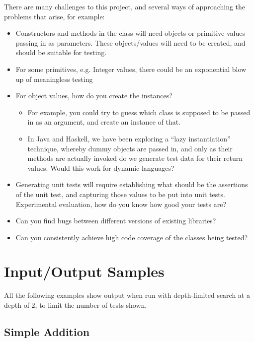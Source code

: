 There are many challenges to this project, and several ways of
approaching the problems that arise, for example:

\begin{itemize}
\item Constructors and methods in the class will need objects or primitive
  values passing in as parameters. These objects/values will need
  to be created, and should be suitable for testing.

\item For some primitives, e.g. Integer values, there could be an exponential
  blow up of meaningless testing

\item For object values, how do you create the instances?
\begin{itemize}
\item For example, you could try to guess which class is supposed to be
      passed in as an argument, and create an instance of that.
\item In Java and Haskell, we have been exploring a ``lazy
      instantiation'' technique, whereby dummy objects are passed in,
      and only as their methods are actually invoked do we generate
      test data for their return values. Would this work for dynamic
      languages?
\end{itemize}

\item Generating unit tests will require establishing what should be the
      assertions of the unit test, and capturing those values to be put
      into unit tests.
      Experimental evaluation, how do you know how good your tests are?

\item Can you find bugs between different versions of existing libraries?

\item Can you consistently achieve high code coverage of the classes
      being tested?
\end{itemize}

\chapter{Input/Output Samples}
\lstset{language=Ruby}

All the following examples show output when run with depth-limited search at a
depth of 2, to limit the number of tests shown.

\section{Simple Addition}
